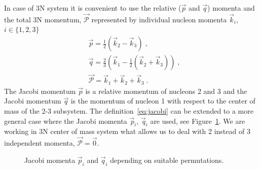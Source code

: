 In case of 3N system it is convenient to use the relative ($\vec{p}$ and $\vec{q}$) momenta and the total 3N momentum, $\vec{\mathcal{P}}$ represented by individual nucleon momenta $\vec{k}_{i}$, $i \in \lbrace 1,2,3\rbrace$
\begin{equation}
\begin{split}
&\vec{p} = \frac{1}{2}\left(\!\vec{k}_{2} - \!\vec{k}_{3}\right)\;,\\
&\vec{q} = \frac{2}{3}\left(\!\vec{k}_{1} - \frac{1}{2}\left(\!\vec{k}_{2} + \!\vec{k}_{3}\right)\right)\;,\\
&\vec{\mathcal{P}} = \!\vec{k}_{1} + \!\vec{k}_{2} + \!\vec{k}_{3}\;.
\end{split}
\label{eq:jacobi}
\end{equation}
The Jacobi momentum $\vec{p}$ is a relative momentum of nucleons 2 and 3 and the Jacobi momentum $\vec{q}$ is the momentum of nucleon 1 with respect to the center of mass of the 2-3 subsystem. The definition~\ref{eq:jacobi} can be extended to a more general case where the Jacobi momenta $\!\vec{\,p}_{i}$, $\!\vec{\,q}_{i}$ are used, see Figure~\ref{fig:jacobi}. We are working in 3N center of mass system what allows us to deal with 2 instead of 3 independent momenta, $\vec{\mathcal{P}} = \vec{0}$. 
\begin{figure}
\caption{Jacobi momenta $\vec{p}_{i}$ and $\vec{q}_{i}$ depending on suitable permutations.}
\label{fig:jacobi}
\end{figure}

